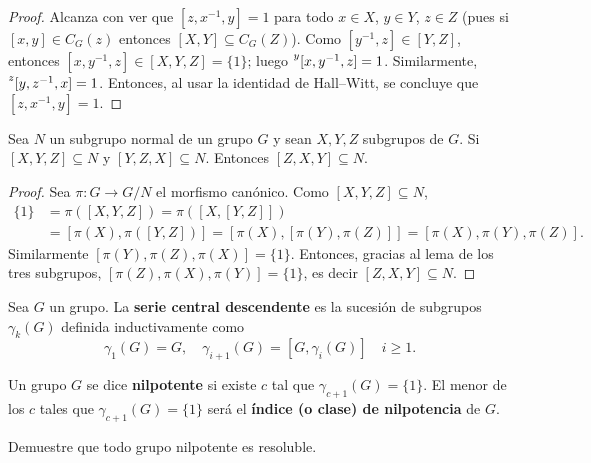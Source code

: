 \begin{proof}
	Alcanza con ver que $[z,x^{-1},y]=1$ para todo $x\in X$, $y\in Y$, $z\in Z$
	(pues si $[x,y]\in C_G(z)$ entonces %
	$[X,Y]\subseteq C_G(Z)$). Como $[y^{-1},z]\in [Y,Z]$, entonces
	$[x,y^{-1},z]\in [X,Y,Z]=\{1\}$; luego $\prescript{y}{}[x,y^{-1},z]=1$.
	Similarmente, $\prescript{z}{}[y,z^{-1},x]=1$. Entonces, al usar la
	identidad de Hall--Witt, se concluye que 
	$[z,x^{-1},y]=1$.
\end{proof}

\begin{lemma}
	\label{lemma:3subgrupos_general}
	Sea $N$ un subgrupo normal de un grupo $G$ y sean $X,Y,Z$
	subgrupos de $G$. Si $[X,Y,Z]\subseteq N$ y $[Y,Z,X]\subseteq N$. Entonces
	$[Z,X,Y]\subseteq N$.
\end{lemma}

\begin{proof}
	Sea $\pi\colon G\to G/N$ el morfismo canónico. Como $[X,Y,Z]\subseteq N$, 
	\begin{align*}
		\{1\}&=\pi([X,Y,Z])=\pi([ X,[Y,Z]])\\
		&=[\pi(X),\pi([Y,Z])]=[ \pi(X),[\pi(Y),\pi(Z)]]=[\pi(X),\pi(Y),\pi(Z)]. 
	\end{align*}
	Similarmente $[\pi(Y),\pi(Z),\pi(X)]=\{1\}$. Entonces, gracias al lema de los
	tres subgrupos, $[\pi(Z),\pi(X),\pi(Y)]=\{1\}$, es decir
	$[Z,X,Y]\subseteq N$.
\end{proof}


\begin{definition}
	Sea $G$ un grupo. La \textbf{serie central descendente} es la sucesión de
	subgrupos $\gamma_k(G)$ definida inductivamente como
	\[
		\gamma_1(G)=G,\quad
		\gamma_{i+1}(G)=[G,\gamma_i(G)]\quad i\geq 1.
	\]
\end{definition}

\begin{definition}
	Un grupo $G$ se dice \textbf{nilpotente} si existe $c$ tal que
	$\gamma_{c+1}(G)=\{1\}$. El menor de los $c$ tales que $\gamma_{c+1}(G)=\{1\}$ será
	el \textbf{índice (o clase) de nilpotencia} de $G$.
\end{definition}

\begin{exercise}
\label{xca:nilpotente=>resoluble}
	Demuestre que todo grupo nilpotente es resoluble.
\end{exercise}

